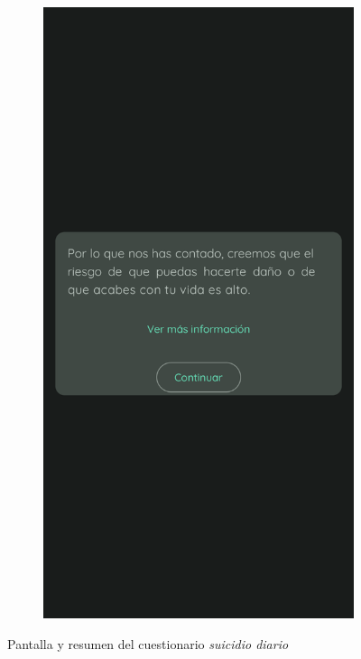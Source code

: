 \begin{figure}[htbp]
\begin{subfigure}[c]{0.4\textwidth}
                	\end{subfigure}
                	\hspace{0.1\textwidth}
                	\begin{subfigure}[c]{0.4\textwidth}
                		\centering
                		\includegraphics[width=1\linewidth]{figures/pantallas/Resumen suicidio.png}
                	\end{subfigure}
                	\caption{Pantalla y resumen del cuestionario \textit{suicidio diario}}
                	\label{figure:implementacion:pantalla:suicidio_diario}
                \end{figure}
                

